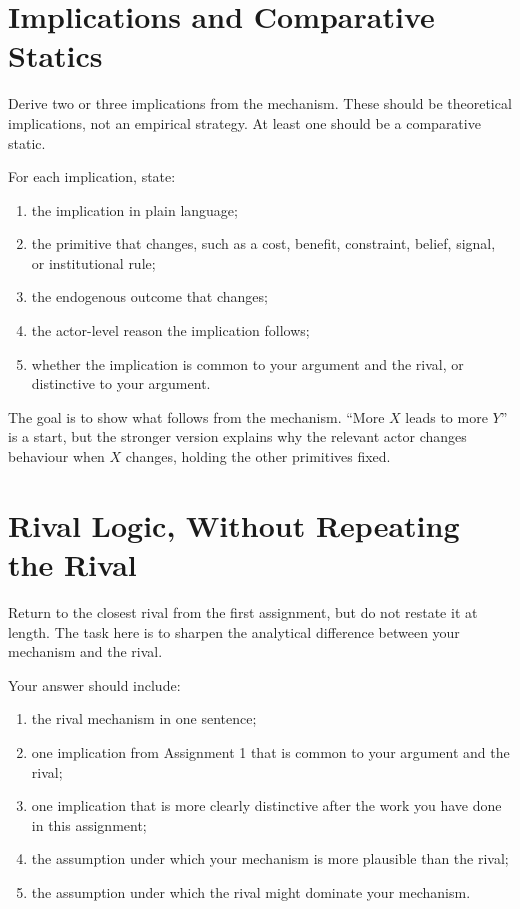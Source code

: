 \documentclass[12pt]{article}
\begin{document}
\section{Implications and Comparative Statics}

Derive two or three implications from the mechanism. These should be theoretical implications, not an empirical strategy. At least one should be a comparative static.

For each implication, state:
\begin{enumerate}[label=(\alph*)]
\item the implication in plain language;
\item the primitive that changes, such as a cost, benefit, constraint, belief, signal, or institutional rule;
\item the endogenous outcome that changes;
\item the actor-level reason the implication follows;
\item whether the implication is common to your argument and the rival, or distinctive to your argument.
\end{enumerate}

The goal is to show what follows from the mechanism. ``More $X$ leads to more $Y$'' is a start, but the stronger version explains why the relevant actor changes behaviour when $X$ changes, holding the other primitives fixed.

\section{Rival Logic, Without Repeating the Rival}

Return to the closest rival from the first assignment, but do not restate it at length. The task here is to sharpen the analytical difference between your mechanism and the rival.

Your answer should include:
\begin{enumerate}[label=(\alph*)]
\item the rival mechanism in one sentence;
\item one implication from Assignment 1 that is common to your argument and the rival;
\item one implication that is more clearly distinctive after the work you have done in this assignment;
\item the assumption under which your mechanism is more plausible than the rival;
\item the assumption under which the rival might dominate your mechanism.
\end{enumerate}
\end{document}
